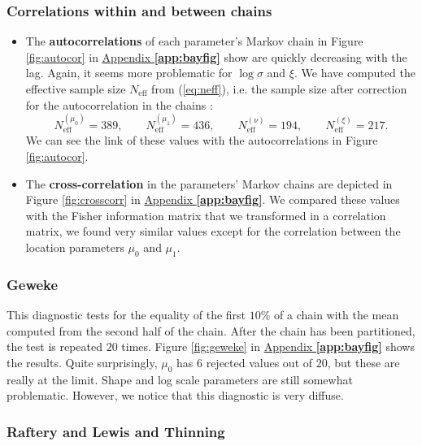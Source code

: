 \subsubsection*{Correlations within and between chains}


\begin{itemize}
	\item The \textbf{autocorrelations} of each parameter's Markov chain in Figure \ref{fig:autocor} in \hyperref[app:bayfig]{Appendix \textbf{\ref{app:bayfig}}} show are quickly decreasing with the lag. Again, it seems more problematic for $\log\sigma$ and $\xi$.	
	We have computed the effective sample size $N_{\text{eff}}$ from (\ref{eq:neff}), i.e. the sample size after correction for the autocorrelation in the chains :
	\begin{equation}
		N_{\text{eff}}^{(\mu_0)} = 389, \qquad 	N_{\text{eff}}^{(\mu_1)} = 436, \qquad 	N_{\text{eff}}^{(\nu)} = 194, \qquad	N_{\text{eff}}^{(\xi)} = 217.
	\end{equation}
	We can see the link of these values with the autocorrelations in Figure \ref{fig:autocor}.
	
	\item The \textbf{cross-correlation} in the parameters' Markov chains are depicted in Figure \ref{fig:crosscorr} in \hyperref[app:bayfig]{Appendix \textbf{\ref{app:bayfig}}}. We compared these values with the Fisher information matrix that we transformed in a correlation matrix, we found very similar values except for the correlation between the location parameters $\mu_0$ and $\mu_1$.
\end{itemize}


\subsubsection*{Geweke}

This diagnostic tests for the equality of the first $10\%$ of a chain with the mean computed from the second half of the chain. After the chain has been partitioned, the test is repeated $20$ times.
Figure \ref{fig:geweke} in \hyperref[app:bayfig]{Appendix \textbf{\ref{app:bayfig}}} shows the results. Quite surprisingly, $\mu_0$ has $6$ rejected values out of $20$, but these are really at the limit. Shape and log scale parameters are still somewhat problematic. However, we notice that this diagnostic is very diffuse.


\subsubsection*{Raftery and Lewis and Thinning}

